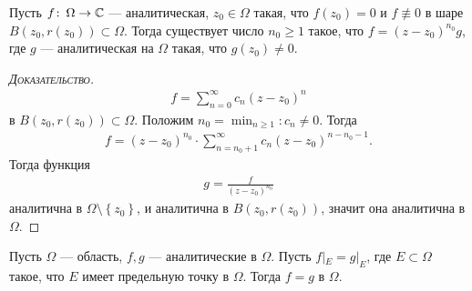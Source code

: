 \documentclass[../complex-analysis.tex]{subfiles}
\begin{document}
\begin{lm}
\label{lemma:zero_multiplicity}
 Пусть $ f\colon\,\Omega \to \mathbb{C} $ --- аналитическая, $ z_0 \in \Omega $ такая, что $ f(z_0) = 0 $ и $ f \not\equiv 0 $ в шаре $ B(z_0,r(z_0)) \subset \Omega $.  Тогда существует число $ n_0 \geqslant 1 $ такое, что $ f = (z - z_0)^{n_0}g $, где $ g $ --- аналитическая на $ \Omega $ такая, что $ g(z_0) \neq 0 $.
\end{lm}
\begin{proof}[\normalfont\textsc{Доказательство}]
 \begin{align*}
  f = \sum_{n=0}^{\infty}c_n(z-z_0)^{n}
 \end{align*} в $ B(z_0, r(z_0)) \subset \Omega $. Положим $ n_0 = \min_{n \geqslant 1} : c_n \neq 0 $. Тогда
 \begin{align*}
  f = (z - z_0)^{n_0} \cdot \sum_{n=n_0 + 1}^{\infty} c_n(z-z_0)^{n - n_0 - 1}.
 \end{align*} Тогда функция
 \begin{align*}
  g = \frac{f}{(z - z_0)^{n_0}}
 \end{align*}  аналитична в $ \Omega \setminus \left\{ z_0 \right\} $, и аналитична в $ B(z_0, r(z_0)) $, значит она аналитична в $ \Omega $.
\end{proof}
\begin{thm}
Пусть $ \Omega $ --- область, $ f,g $ --- аналитические в $ \Omega $. Пусть $ f |_E = g|_E $, где $ E \subset \Omega $ такое, что $ E $ имеет предельную точку в $ \Omega $. Тогда $ f = g $ в $ \Omega $.
\end{thm}
\end{document}
